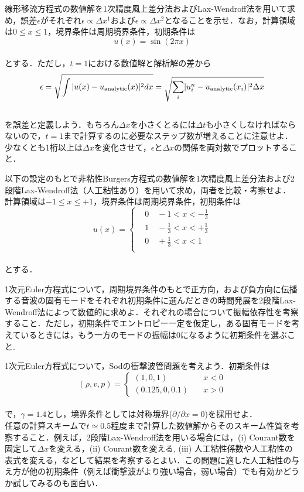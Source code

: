 \documentclass[10pt,a4j]{jarticle}
\renewcommand{\labelenumi}{(-\arabic{enumi})}
\renewenvironment{enumerate}%
{%
\begin{list}{(\arabic{enumi})}
{%
  \usecounter{enumi}
  \setlength{\topsep}{0.0em}
  \setlength{\parskip}{0.0em}
  \setlength{\parsep}{0.0em}
  \setlength{\itemsep}{0.25em}
  \setlength{\itemindent}{1zw}
  \setlength{\leftmargin}{2zw}
  \setlength{\rightmargin}{0zw}
  \setlength{\labelsep}{0.5zw}
  \setlength{\labelwidth}{1zw}
  \setlength{\listparindent}{0zw}
}
}{%
\end{list}%
}
\begin{document}
\begin{enumerate}
\def\labelenumi{.}
\item
  線形移流方程式の数値解を1次精度風上差分法およびLax-Wendroff法を用いて求め，誤差\(\epsilon\)がそれぞれ\(\epsilon \propto \Delta x^1\)および\(\epsilon \propto \Delta x^2\)となることを示せ．なお，計算領域は\(0 \leq x \leq 1\)，境界条件は周期境界条件，初期条件は\\
  \[
  u(x) = \sin \left ( 2 \pi x \right)
  \]\\
  とする．ただし，\(t = 1\)における数値解と解析解の差から\\
  \[
  \epsilon =
  \sqrt{ \int \vert u(x) - u_{\rm analytic}(x) \rvert^2 dx} =
  \sqrt{ \sum_{i} \lvert u_{i}^{n} - u_{\rm analytic}(x_i) \rvert^2 \Delta x}
  \]\\
  を誤差と定義しよう．もちろん\(\Delta x\)を小さくとるには\(\Delta t\)も小さくしなければならないので，\(t = 1\)まで計算するのに必要なステップ数が増えることに注意せよ．少なくとも1桁以上は\(\Delta x\)を変化させて，\(\epsilon\)と\(\Delta x\)の関係を両対数でプロットすること．
\item
  以下の設定のもとで非粘性Burgers方程式の数値解を1次精度風上差分法および2段階Lax-Wendroff法（人工粘性あり）を用いて求め，両者を比較・考察せよ．\\
  計算領域は\(-1 \leq x \leq +1\)，境界条件は周期境界条件，初期条件は\\
  \[
  u(x) =
  \begin{cases}
  & 0 \quad -1 < x < -\frac{1}{3} \\
  & 1 \quad -\frac{1}{3} < x < +\frac{1}{3} \\
  & 0 \quad +\frac{1}{3} < x < 1 \\
  \end{cases}
  \]\\
  とする．
\item
  1次元Euler方程式について，周期境界条件のもとで正方向，および負方向に伝播する音波の固有モードをそれぞれ初期条件に選んだときの時間発展を2段階Lax-Wendroff法によって数値的に求めよ．それぞれの場合について振幅依存性を考察すること．ただし，初期条件でエントロピー一定を仮定し，ある固有モードを考えているときには，もう一方のモードの振幅は0になるように初期条件を選ぶこと.
\item
  1次元Euler方程式について，Sodの衝撃波管問題を考えよう．初期条件は\\
  \[
  (\rho, v, p)
  =
  \begin{cases}
  (1, 0, 1) \quad & x < 0
  \\
  (0.125, 0, 0.1) \quad & x > 0
  \end{cases}
  \]\\
  で，\(\gamma = 1.4\)とし，境界条件としては対称境界(\(\partial/\partial x = 0\))を採用せよ．\\
  任意の計算スキームで\(t \simeq 0.5\)程度まで計算した数値解からそのスキーム性質を考察すること．例えば，2段階Lax-Wendroff法を用いる場合には，(i)
  Courant数を固定して\(\Delta x\)を変える，(ii) Courant数を変える, (iii)
  人工粘性係数や人工粘性の表式を変える，などして結果を考察するとよい．この問題に適した人工粘性の与え方が他の初期条件（例えば衝撃波がより強い場合，弱い場合）でも有効かどうか試してみるのも面白い．
\end{enumerate}
\end{document}
